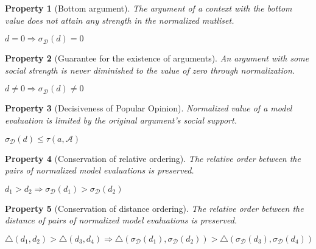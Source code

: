 \documentclass{article}
\newtheorem{property}{Property}
\newcommand{\args}{\mathcal{A}} %
\newcommand{\dataset}{\mathcal{D}}   %
\begin{document}
\begin{property}  [Bottom argument] The argument of a context with the bottom value does not attain any strength in the normalized mutliset.
\begin{center}
$d = 0 \Rightarrow \sigma_{\dataset}(d) = 0$	%
\end{center}
\end{property}

\begin{property}  [Guarantee for the existence of arguments] An argument with some social strength is never diminished to the value of zero through normalization.
\begin{center}
$d \neq 0 \Rightarrow \sigma_{\dataset}(d) \neq 0$
\end{center}
\end{property}

\begin{property}  [Decisiveness of Popular Opinion] Normalized value of a model evaluation is limited by the original argument's social support.
\begin{center}
$ \sigma_{\dataset}(d) \leq \tau(a, \args)$
\end{center}
\end{property}

\begin{property} [Conservation of relative ordering] The relative order between the pairs of normalized model evaluations is preserved.
\begin{center}
 $d_1 > d_2 \Longrightarrow \sigma_{\dataset}(d_1) > \sigma_{\dataset}(d_2)$\\%
\end{center}
\end{property}

\begin{property} [Conservation of distance ordering] The relative order between the distance of pairs of normalized model evaluations is preserved. 
\begin{center}
 $\bigtriangleup(d_1, d_2) > \bigtriangleup(d_3, d_4) \Longrightarrow 
\bigtriangleup(\sigma_{\dataset}(d_1), \sigma_{\dataset}(d_2)) > \bigtriangleup(\sigma_{\dataset}(d_3), \sigma_{\dataset}(d_4))$\\%
\end{center}
\end{property}
\end{document}
